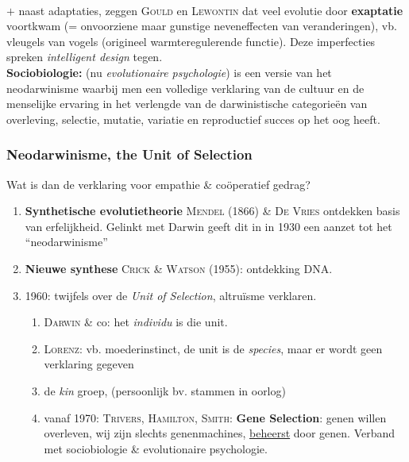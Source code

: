 \\
$+$ naast adaptaties, zeggen \textsc{Gould} en \textsc{Lewontin} dat veel evolutie door \textbf{exaptatie} voortkwam (= onvoorziene maar gunstige neveneffecten van veranderingen), vb. vleugels van vogels (origineel warmteregulerende functie). Deze imperfecties spreken \emph{intelligent design} tegen.
\\ \textbf{Sociobiologie:} (nu \textit{evolutionaire psychologie}) is een versie van het neodarwinisme waarbij men een volledige verklaring van de cultuur en de menselijke ervaring in het verlengde van de darwinistische categorie\"en van overleving, selectie, mutatie, variatie en reproductief succes op het oog heeft.

\subsubsection*{Neodarwinisme, the Unit of Selection}
Wat is dan de verklaring voor empathie \& co\"operatief gedrag? 

\begin{enumerate}
\item \textbf{Synthetische evolutietheorie} \textsc{Mendel} (1866) \& \textsc{De Vries} ontdekken basis van erfelijkheid. Gelinkt met Darwin geeft dit in in 1930 een aanzet tot het ``neodarwinisme''
\item \textbf{Nieuwe synthese} \textsc{Crick \& Watson} (1955): ontdekking DNA.
\item 1960: twijfels over de \emph{Unit of Selection}, altru\"isme verklaren.
	\begin{enumerate}
	\item \textsc{Darwin} \& co: het \emph{individu} is die unit.
	\item \textsc{Lorenz}: vb. moederinstinct, de unit is de \emph{species}, maar er wordt geen verklaring gegeven
	\item de \emph{kin} groep, (persoonlijk bv. stammen in oorlog)
	\item vanaf 1970: \textsc{Trivers}, \textsc{Hamilton}, \textsc{Smith}: \textbf{Gene Selection}: genen willen overleven, wij zijn slechts genenmachines, \underline{beheerst} door genen. Verband met sociobiologie \& evolutionaire psychologie.
	
	\end{enumerate}
\end{enumerate}

